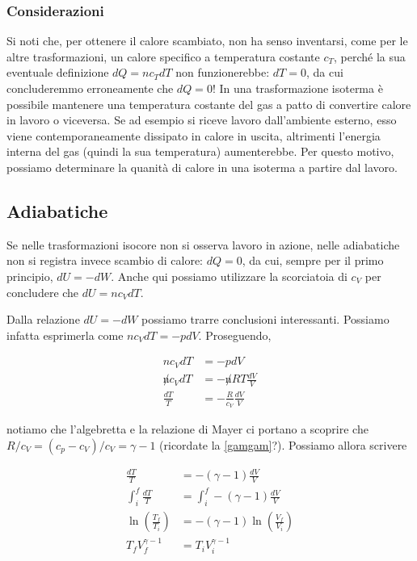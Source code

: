 \subsubsection*{Considerazioni}
Si noti che, per ottenere il calore scambiato, non ha
senso inventarsi, come per le altre trasformazioni, un calore specifico
a temperatura costante $c_T$, perché la sua eventuale definizione
$dQ = nc_TdT$ non funzionerebbe: $dT = 0$, da cui concluderemmo erroneamente che
$dQ = 0$! In una trasformazione isoterma è possibile
mantenere una temperatura costante del gas a patto di convertire
calore in lavoro o viceversa. Se ad esempio si riceve lavoro dall'ambiente esterno,
esso viene contemporaneamente dissipato in calore in uscita, altrimenti
l'energia interna del gas (quindi la sua temperatura) aumenterebbe.
Per questo motivo, possiamo determinare la quanità di calore in una
isoterma a partire dal lavoro.


\subsection{Adiabatiche}
Se nelle trasformazioni isocore non si osserva lavoro in azione, nelle
adiabatiche non si registra invece scambio di calore: $dQ = 0$, da cui,
sempre per il primo principio, $dU = -dW$. Anche qui possiamo utilizzare
la scorciatoia di $c_V$ per concludere che $dU = nc_VdT$.

Dalla relazione $dU = -dW$ possiamo trarre conclusioni interessanti.
Possiamo infatta esprimerla come $nc_VdT = -pdV$. Proseguendo,

\begin{align*}
    nc_VdT &= -pdV\\
    \not n c_VdT &= -\not n RT\frac{dV}{V}\\
    \frac{dT}{T} &= -\frac{R}{c_V}\frac{dV}{V}
\end{align*}

\noindent notiamo che l'algebretta e la relazione di Mayer
ci portano a scoprire che $R/c_V = (c_p - c_V)/c_V = \gamma - 1$
(ricordate la \ref{gamgam}?). Possiamo allora scrivere

\begin{align*}
    \frac{dT}{T} &= -(\gamma - 1)\frac{dV}{V}\\
    \int_{i}^{f}\frac{dT}{T} &= \int_{i}^{f}-(\gamma - 1)\frac{dV}{V}\\
    \ln\left(\frac{T_f}{T_i}\right) &= -(\gamma - 1)\ln\left(\frac{V_f}{V_i}\right)\\
    T_fV_f^{\gamma - 1} &= T_iV_i^{\gamma - 1}
\end{align*}

